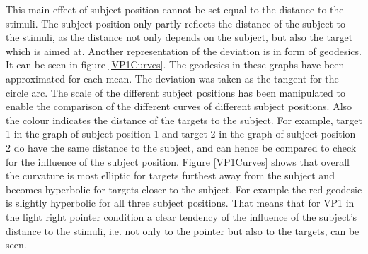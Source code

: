 This main effect of subject position cannot be set equal to the distance to the stimuli. The subject position only partly reflects the distance of the subject to the stimuli, as the distance not only depends on the subject, but also the target which is aimed at. Another representation of the deviation is in form of geodesics. It can be seen in figure \ref{VP1Curves}. The geodesics in these graphs have been approximated for each mean. The deviation was taken as the tangent for the circle arc. 
The scale of the different subject positions has been manipulated to enable the comparison of the different curves of different subject positions. Also the colour indicates the distance of the targets to the subject.  For example, target 1 in the graph of subject position 1 and target 2 in the graph of subject position 2 do have the same distance to the subject, and can hence be compared to check for the influence of the subject position. Figure \ref{VP1Curves} shows that overall the curvature is most elliptic for targets furthest away from the subject and becomes hyperbolic for targets closer to the subject. For example the red geodesic is slightly hyperbolic for all three subject positions. That means that for VP1 in the light right pointer condition a clear tendency of the influence of the subject's distance to the stimuli, i.e. not only to the pointer but also to the targets, can be seen.  

